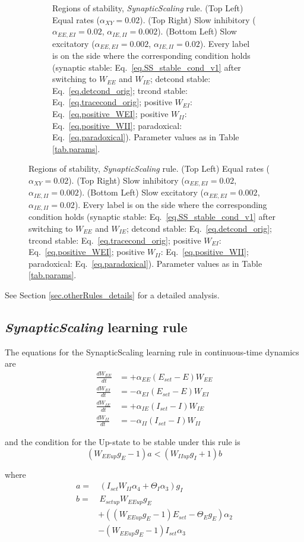 \documentclass[twocolumn]{article}
\newcommand{\EE}{\mathit{EE}}
\newcommand{\EI}{\mathit{EI}}
\newcommand{\IE}{\mathit{IE}}
\newcommand{\II}{\mathit{II}}
\newcommand{\XY}{\mathit{XY}}
\newcommand{\set}{\mathit{set}}
\newcommand{\up}{\mathit{up}}
\begin{document}
\begin{figure}[!ht]
{\begin{figure}[H]
\caption{Regions of stability, {\em SynapticScaling} rule. (Top Left) Equal rates ($\alpha_{\XY}=0.02$). (Top Right) Slow inhibitory ($\alpha_{\EE,\EI}=0.02$, $\alpha_{\IE,\II}=0.002$). (Bottom Left) Slow excitatory ($\alpha_{\EE,\EI}=0.002$, $\alpha_{\IE,\II}=0.02$). Every label is on the side where the  corresponding  condition  holds (synaptic stable: Eq.\ \ref{eq.SS_stable_cond_v1} after switching to $W_{\EE}$ and $W_{\IE}$; detcond stable: Eq.\ \ref{eq.detcond_orig}; trcond stable: Eq.\ \ref{eq.tracecond_orig}; positive $W_{\EI}$: Eq.\ \ref{eq.positive_WEI}; positive $W_{\II}$: Eq.\ \ref{eq.positive_WII}; paradoxical: Eq.\ \ref{eq.paradoxical}). Parameter values as in Table \ref{tab.params}.}
\label{fig.SS_stability}
\end{figure}}
\end{figure}




See Section \ref{sec.otherRules_details} for a detailed analysis.



\subsection{{\em SynapticScaling} learning rule}


The equations for the SynapticScaling learning rule in continuous-time dynamics are
\begin{equation}
\begin{aligned}
\frac{dW_{\EE}}{dt} & = +\alpha_{\EE} (E_{\set} - E) W_{\EE} \\
\frac{dW_{\EI}}{dt} & = -\alpha_{\EI} (E_{\set} - E) W_{\EI} \\
\frac{dW_{\IE}}{dt} & = +\alpha_{\IE} (I_{\set} - I) W_{\IE} \\
\frac{dW_{\II}}{dt} & = -\alpha_{\II} (I_{\set} - I) W_{\II}
\end{aligned}
\label{eq.SS_summary}
\end{equation}

\noindent and the condition for the Up-state to be stable under this rule is
\begin{equation}
(W_{\EE\up}g_E - 1)a < (W_{\II\up}g_I + 1)b
\label{eq.SS_stable_cond_v1}
\end{equation}

\noindent where
\begin{displaymath}
\begin{aligned}
a = & \, (I_{\set} W_{\II} \alpha_4 + \Theta_I \alpha_3)g_I \\
b = & \, E_{\set\up} W_{\EE\up}g_E \\
& + ((W_{\EE\up} g_E - 1) E_{\set} - \Theta_E g_E)\alpha_2 \\
& - (W_{\EE\up} g_E - 1) I_{\set} \alpha_3
\end{aligned}
\end{displaymath}
\end{document}
